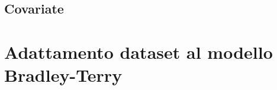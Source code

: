 \subsection{Covariate}

\section{Adattamento dataset al modello Bradley-Terry}
\begin{comment}
	\begin{table}[h]%
		\rowcolors{2}{grigetto}{white}
		\renewcommand{\arraystretch}{1.7}
		\centering
		\begin{tabularx}{\textwidth}{c c X}
			\hline	
			\rowcolor{heavenly}
			\intest{Durata in ore} & \intest{Date (inizio - fine)} & \intest{Attività} \\	
			\hline			
			24 &  01/07/2020 - 03/07/2020 & Studio delle tecnologie Angular 2+ e Ionic, da utilizzare durante lo stage.\\
			
			40 &  06/07/2020 - 10/07/2020 & Studio di componenti dell'architettura di sistema di Azzurra, creazione di \emph{test} per la \emph{dashboard} di \gls{AWMS} e per l'applicazione \emph{mobile}. \\
			
			40 &  13/07/2020 - 17/07/2020 & Continuazione studio delle componenti del sistema di Azzurra, analisi, progettazione e implementazione di flussi conversazionali.\\
			
			40 &  20/07/2020 - 24/07/2020 & Documentazione per le componenti di Azzurra.\\
			
			40 &  27/07/2020 - 31/07/2020 & Continuazione studio di altre componenti di \gls{AWMS}.\\
			
			40 &  03/08/2020 - 07/08/2020 & Documentazione delle componenti \gls{AWMS} e implementazione \glslink{notifica push}{notifiche push}\textcolor{SchoolColor}{\ap{[g]}}.\\
			
			40 &  17/08/2020 - 21/08/2020 & Progettazione, implementazione e documentazione di \emph{template engine} multi-lingua.\\
			
			40 &  24/08/2020 - 28/08/2020 & Studio della gestione dei comportamenti \emph{mobile} \emph{application} in condizioni di mancanza di connettività.\\
			
			16 &  31/08/2020 - 01/09/2020 & Continuazione ottava settimana. \\
			\hline
		\end{tabularx} \hbox{}
		
		\caption{Tabella riassuntiva delle attività pianificate per il progetto di stage}
	\end{table}
\end{comment}
